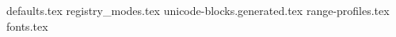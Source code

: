 
\RequirePackage{import}
\providecommand{\CatalogFontRoot}{}

\makeatletter
{}
  {\newif\ifNextSystemInstalled\NextSystemInstalledfalse}
  {}
\makeatother

\ifNextSystemInstalled
  
  
  
  
  
\else
  {defaults.tex}
  {registry_modes.tex}
  {unicode-blocks.generated.tex}
  {range-profiles.tex}
  {fonts.tex}
\fi
